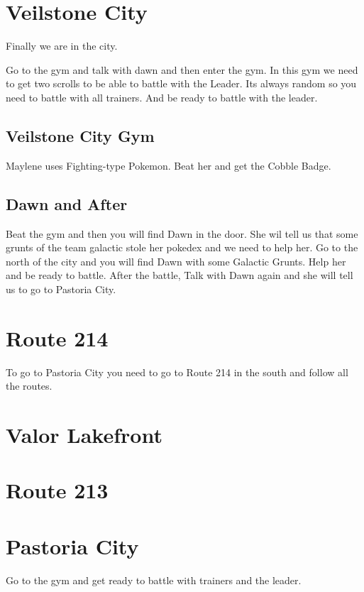 \documentclass[11pt]{article}
\begin{document}


\section{Veilstone City}\label{sec:veilstone-city}
Finally we are in the city.

Go to the gym and talk with dawn and then enter the gym.
In this gym we need to get two scrolls to be able to battle with the Leader.
Its always random so you need to battle with all trainers.
And be ready to battle with the leader.

\subsection{Veilstone City Gym}\label{subsec:veilstone-city-gym}
Maylene uses Fighting-type Pokemon.
Beat her and get the Cobble Badge.

\subsection{Dawn and After}\label{subsec:dawn-and-after}
Beat the gym and then you will find Dawn in the door.
She wil tell us that some grunts of the team galactic stole her pokedex and we need to help her.
Go to the north of the city and you will find Dawn with some Galactic Grunts.
Help her and be ready to battle.
After the battle, Talk with Dawn again and she will tell us to go to Pastoria City.

\section{Route 214}\label{sec:Route_214}

To go to Pastoria City you need to go to Route 214 in the south and follow all the routes.



\section{Valor Lakefront}\label{sec:Valor_Lakefront}


\section{Route 213}\label{sec:Route_213}


\section{Pastoria City}\label{sec:pastoria-city}
Go to the gym and get ready to battle with trainers and the leader.
\end{document}
